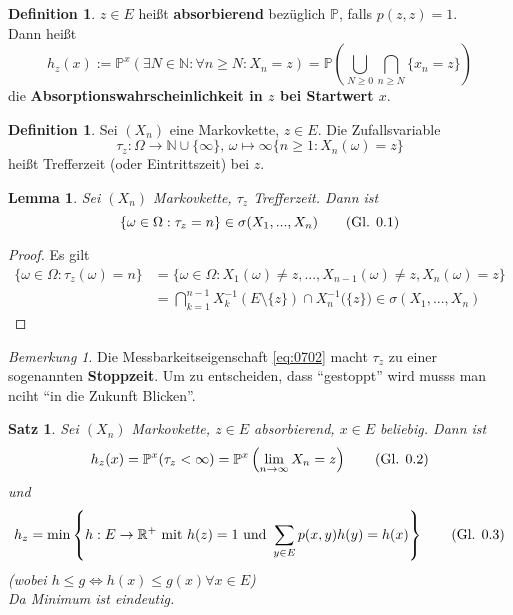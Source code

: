 \documentclass[10pt,a4paper]{article}
\newcommand{\N}{\ensuremath{\mathbb{N}}}
\newcommand{\R}{\ensuremath{\mathbb{R}}}
\newcommand{\Prb}{\mathbb P}
\theoremstyle{plain}
\newtheorem{lem}[theorem]{Lemma}
\newtheorem{satz}[theorem]{Satz}
\theoremstyle{definition}
\newtheorem{definition}[theorem]{Definition}
\theoremstyle{remark}
\newtheorem*{bem*}{Bemerkung}
\newcommand{\autotag}{\stepcounter{equation}\tag{Gl. \arabic{section}.\arabic{equation}}}
\begin{document}
	\begin{definition}\label{0710def}
		$z\in E$ heißt \textbf{absorbierend} bezüglich $\Prb$, falls $p(z,z)=1$.\\
		Dann heißt
		\[h_z(x):=\Prb^x\left(\exists N\in\N:\forall n\geq N:X_n=z\right)=\Prb\left(\bigcup_{N\geq 0}\bigcap_{n\geq N}\{x_n=z\}\right)\]
		die \textbf{Absorptionswahrscheinlichkeit in $z$ bei Startwert $x$}.
	\end{definition}
	
	\begin{definition}\label{0711def}
		Sei $(X_n)$ eine Markovkette, $z\in E$. Die Zufallsvariable
		\[\tau_z:\Omega\to\N\cup\{\infty\},\,\omega\mapsto\infty\{n\geq 1:X_n(\omega)=z\}\]
		heißt Trefferzeit (oder Eintrittszeit) bei $z$.
	\end{definition}
	
	\begin{lem}\label{0712lem}
		Sei $(X_n)$ Markovkette, $\tau_z$ Trefferzeit. Dann ist
		\[\{\omega\in\Omega:\tau_z=n\}\in\sigma(X_1,...,X_n)\autotag\label{eq:0702}\]
	\end{lem}
	\begin{proof}
		Es gilt\begin{align*}
		\{\omega\in\Omega:\tau_z(\omega)=n\}&=\{\omega\in\Omega:X_1(\omega)\neq z,...,X_{n-1}(\omega)\neq z,X_n(\omega)=z\}\\
		&=\bigcap_{k=1}^{n-1}X_k^{-1}\left(E\setminus\{z\}\right)\cap X_n^{-1}\big(\{z\}\big)\in\sigma(X_1,...,X_n)
		\end{align*}
	\end{proof}

	\begin{bem*}
		Die Messbarkeitseigenschaft \ref{eq:0702} macht $\tau_z$ zu einer sogenannten \textbf{Stoppzeit}. Um zu entscheiden, dass \enquote{gestoppt} wird musss man nciht \enquote{in die Zukunft Blicken}.
	\end{bem*}

	\begin{satz}\label{0713}
		Sei $(X_n)$ Markovkette, $z\in E$ absorbierend, $x\in E$ beliebig. Dann ist
		\[h_z(x)=\Prb^x(\tau_z<\infty)=\Prb^x\left(\lim\limits_{n\to\infty}X_n=z\right)\autotag\label{eq:0703}\]
		und
		\[h_z=\min\left\{h:E\to\R^+\text{ mit }h(z)=1\text{ und }\sum_{y\in E}p(x,y)h(y)=h(x)\right\} \autotag \label{eq:0704}\]
		(wobei $h\leq g\Leftrightarrow h(x)\leq g(x)\forall x\in E$)\\
		Da Minimum ist eindeutig.
	\end{satz}
\end{document}
